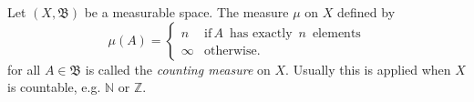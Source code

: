 \documentclass[12pt]{article}
\newcommand{\borel}{\mathfrak{B}}
\newcommand{\integers}{\mathbb{Z}}
\newcommand{\naturals}{\mathbb{N}}
\begin{document}
Let $(X,\borel)$ be a measurable space.  The measure $\mu$ on $X$ defined by
\begin{equation*}
\mu(A) = \left\{
\begin{array}{ll}
n & \text{if}\, A\, \text{ has exactly }\, n\, \text{ elements} \\
\infty & \text{otherwise.}
\end{array}
\right.
\end{equation*}
for all $A\in\borel$ is called the \textit{counting measure} on $X$. 
Usually this is applied when $X$ is countable, e.g. $\naturals$ or $\integers$.
\end{document}
